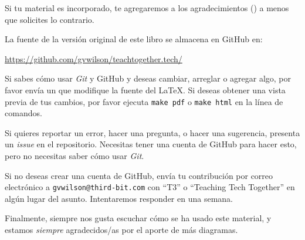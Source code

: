 Si tu material es incorporado,
te agregaremos a los agradecimientos () a menos que solicites lo contrario.

La fuente de la versión original de este libro se almacena en GitHub en:

\begin{center}
  \url{https://github.com/gvwilson/teachtogether.tech/}
\end{center}

\noindent
Si sabes cómo usar \emph{Git} y GitHub y deseas cambiar, arreglar o agregar algo,
por favor envía un  que modifique la fuente del LaTeX.
Si deseas obtener una vista previa de tus cambios,
por favor ejecuta \texttt{make~pdf} o \texttt{make~html} en la línea de comandos.

Si quieres reportar un error,
hacer una pregunta,
o hacer una sugerencia,
presenta un \emph{issue} en el repositorio.
Necesitas tener una cuenta de GitHub para hacer esto,
pero no necesitas saber cómo usar \emph{Git}.

Si no deseas crear una cuenta de GitHub,
envía tu contribución por correo electrónico a \texttt{gvwilson@third-bit.com}
con ``T3'' o ``Teaching Tech Together'' en algún lugar del asunto.
Intentaremos responder en una semana.

Finalmente,
siempre nos gusta escuchar cómo se ha usado este material,
y estamos \emph{siempre} agradecidos/as por el aporte de más diagramas.
